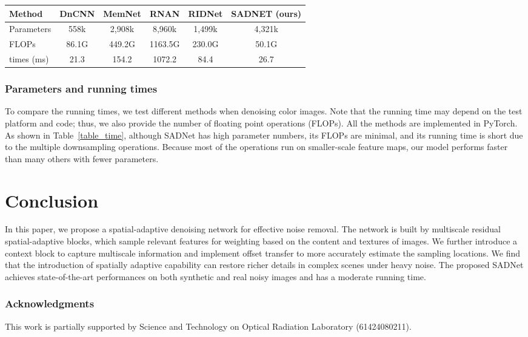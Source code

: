 \documentclass[runningheads]{llncs}
\begin{document}
\begin{table*}
\setlength{\tabcolsep}{4pt}
\begin{center}
\caption{Parameters and time comparisons on  color images}
\label{table_time}
\begin{tabular}{lccccc}
\hline
Method & DnCNN & MemNet & RNAN & RIDNet & SADNET (ours)\\
\hline\hline
Parameters & 558k & 2,908k & 8,960k & 1,499k & 4,321k \\
FLOPs & 86.1G & 449.2G & 1163.5G & 230.0G & 50.1G \\
times (ms) & 21.3 & 154.2 & 1072.2 & 84.4 & 26.7 \\
\hline
\end{tabular}
\end{center}
\end{table*}

\subsubsection{Parameters and running times}

To compare the running times, we test different methods when denoising  color images. Note that the running time may depend on the test platform and code; thus, we also provide the number of floating point operations (FLOPs). All the methods are implemented in PyTorch. As shown in Table~\ref{table_time}, although SADNet has high parameter numbers, its FLOPs are minimal, and its running time is short due to the multiple downsampling operations. Because most of the operations run on smaller-scale feature maps, our model performs faster than many others with fewer parameters.

\section{Conclusion}

In this paper, we propose a spatial-adaptive denoising network for effective noise removal. The network is built by multiscale residual spatial-adaptive blocks, which sample relevant features for weighting based on the content and textures of images. We further introduce a context block to capture multiscale information and implement offset transfer to more accurately estimate the sampling locations. We find that the introduction of spatially adaptive capability can restore richer details in complex scenes under heavy noise. The proposed SADNet achieves state-of-the-art performances on both synthetic and real noisy images and has a moderate running time.   

\subsubsection{Acknowledgments}

This work is partially supported by Science and Technology on Optical Radiation Laboratory (61424080211).





\end{document}
